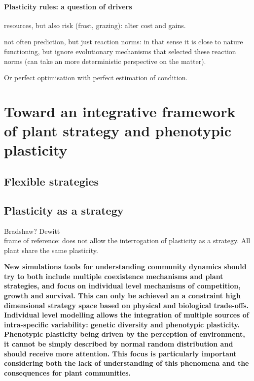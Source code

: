 \paragraph{Plasticity rules: a question of drivers}

resources, but also risk (frost, grazing): alter cost and gains.

not often prediction, but just reaction norms: in that sense it is close to nature functioning, but ignore evolutionary mechanisms that selected these reaction norms (can take an more deterministic perspective on the matter).

Or perfect optimisation with perfect estimation of condition.





\textbf{}

\section{Toward an integrative framework of plant strategy and phenotypic plasticity}


\subsection{Flexible strategies}

\subsection{Plasticity as a strategy}


Bradshaw?
Dewitt\\

frame of reference: does not allow the interrogation of plasticity as a strategy. All plant share the same plasticity.



\textbf{New simulations tools for understanding community dynamics should try to both include multiple coexistence mechanisms and plant strategies, and focus on individual level mechanisms of competition, growth and survival. This can only be achieved an a constraint high dimensional strategy space based on physical and biological trade-offs. Individual level modelling allows the integration of multiple sources of intra-specific variability: genetic diversity and phenotypic plasticity. Phenotypic plasticity being driven by the perception of environment, it cannot be simply described by normal random distribution and should receive more attention. This focus is particularly important considering both the lack of understanding of this phenomena and the consequences for plant communities.  }


